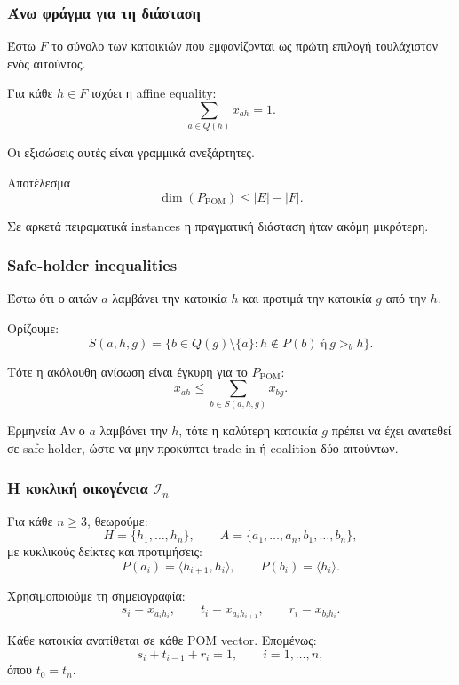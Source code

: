 \documentclass{beamer}
\begin{document}
	\begin{frame}
		\frametitle{Άνω φράγμα για τη διάσταση}
		
		Έστω $F$ το σύνολο των κατοικιών που εμφανίζονται ως πρώτη επιλογή τουλάχιστον ενός αιτούντος.
		
		Για κάθε $h\in F$ ισχύει η affine equality:
		\[
		\sum_{a\in Q(h)}x_{ah}=1.
		\]
		
		Οι εξισώσεις αυτές είναι γραμμικά ανεξάρτητες.
		
		\begin{block}{Αποτέλεσμα}
			\[
			\dim(P_{\mathrm{POM}})
			\leq
			|E|-|F|.
			\]
		\end{block}
		
		Σε αρκετά πειραματικά instances η πραγματική διάσταση ήταν ακόμη μικρότερη.
	\end{frame}
	
	\begin{frame}
		\frametitle{Safe-holder inequalities}
		
		Έστω ότι ο αιτών $a$ λαμβάνει την κατοικία $h$ και προτιμά την κατοικία $g$ από την $h$.
		
		Ορίζουμε:
		\[
		S(a,h,g)
		=
		\{b\in Q(g)\setminus\{a\}:
		h\notin P(b)\ \text{ή}\ g>_b h\}.
		\]
		
		Τότε η ακόλουθη ανίσωση είναι έγκυρη για το $P_{\mathrm{POM}}$:
		\[
		x_{ah}
		\leq
		\sum_{b\in S(a,h,g)}x_{bg}.
		\]
		
		\begin{block}{Ερμηνεία}
			Αν ο $a$ λαμβάνει την $h$, τότε η καλύτερη κατοικία $g$ πρέπει να έχει ανατεθεί σε safe holder, ώστε να μην προκύπτει trade-in ή coalition δύο αιτούντων.
		\end{block}
	\end{frame}
	
	
	\begin{frame}
		\frametitle{Η κυκλική οικογένεια $\mathcal{I}_n$}
		
		Για κάθε $n\geq 3$, θεωρούμε:
		\[
		H=\{h_1,\ldots,h_n\},
		\qquad
		A=\{a_1,\ldots,a_n,b_1,\ldots,b_n\},
		\]
		με κυκλικούς δείκτες και προτιμήσεις:
		\[
		P(a_i)=\langle h_{i+1},h_i\rangle,
		\qquad
		P(b_i)=\langle h_i\rangle.
		\]
		
		Χρησιμοποιούμε τη σημειογραφία:
		\[
		s_i=x_{a_i h_i},
		\qquad
		t_i=x_{a_i h_{i+1}},
		\qquad
		r_i=x_{b_i h_i}.
		\]
		
		Κάθε κατοικία ανατίθεται σε κάθε POM vector. Επομένως:
		\[
		s_i+t_{i-1}+r_i=1,
		\qquad i=1,\ldots,n,
		\]
		όπου $t_0=t_n$.
	\end{frame}
	
\end{document}

